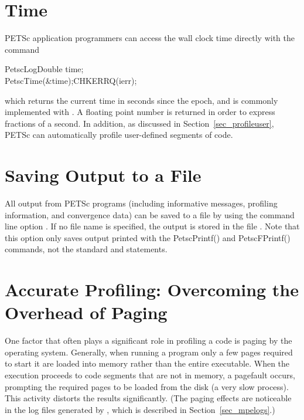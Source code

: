 {{%
\section{Time}

PETSc application programmers can access the wall clock time directly
with the command 
\begin{tabbing}
  PetscLogDouble time;\\
  PetscTime(\&time);CHKERRQ(ierr);
\end{tabbing}
which returns the current time in seconds since the epoch, and is commonly
implemented with . A floating point number is returned in order
to express fractions of a second. In addition, as discussed in Section~\ref{sec_profileuser},
PETSc can automatically profile user-defined segments of code.

\section{Saving Output to a File}

All output from PETSc programs (including informative messages, profiling information,
and convergence data) can be saved to a file by using the command line
option . 
If no file name is specified, the output is stored in the file .
 Note that this option only saves output printed with
the PetscPrintf() and PetscFPrintf() commands, not the
standard  and  statements.

\section{Accurate Profiling: Overcoming the Overhead of Paging}
\label{sec_profaccuracy}

One factor that often plays a significant role in profiling a code is
paging by the operating system.  Generally, when running a program
only a few pages required to start it are loaded into memory rather
than the entire executable.  When the execution proceeds to code
segments that are not in memory, a pagefault occurs, prompting the
required pages to be loaded from the disk (a very slow process).  This
activity distorts the results significantly. (The paging effects are
noticeable in the log files generated by , which is
described in Section~\ref{sec_mpelogs}.)

}}
